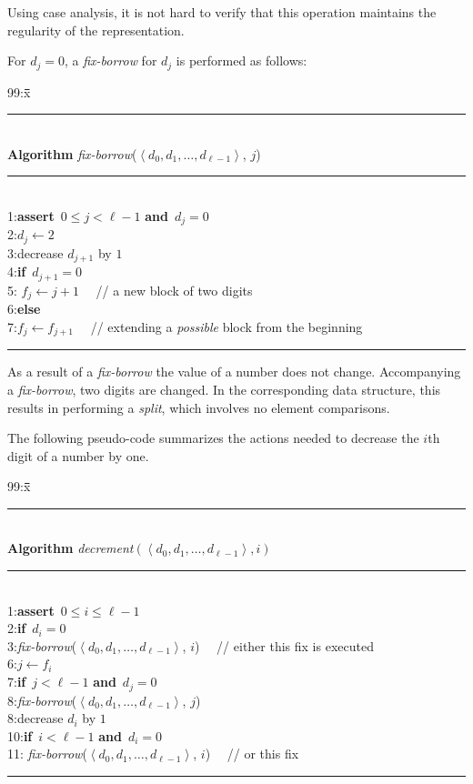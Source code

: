 \documentclass{llncs}
\newenvironment{algorithm}{\par\vspace*{-2mm}\quad\begin{minipage}[t]{0.925\textwidth}\begin{tabbing}99:x\=\quad\=\quad\=\quad\=\quad\=\quad\=\kill}{\end{tabbing}\end{minipage}\par\vspace*{-3mm}}
\newcommand{\ASSERT}{\textbf{assert}\ }
\newcommand{\IF}{\textbf{if}\ }
\newcommand{\ELSE}{\textbf{else}\ }
\newcommand{\AND}{\textbf{and}\ }
\newcommand{\sequence}[1]{\left\langle#1\right\rangle}
\begin{document}
\noindent
Using case analysis, it is not hard to verify that this operation maintains the
regularity of the representation.

For $d_j=0$, a \emph{fix-borrow} for $d_j$ is performed as follows: 

\begin{center}
\begin{algorithm}
\rule[6pt]{\textwidth}{0.45pt}\\[-6pt]
\textbf{Algorithm} \textit{fix-borrow}($\sequence{d_0,d_1,\ldots,d_{\ell-1}}$, $j$)\\
\rule[6pt]{\textwidth}{0.45pt}\\[-6pt]
1:\>\ASSERT $0 \leq j < \ell-1$ \AND $d_j=0$\\
2:\>$d_j \leftarrow 2$\\
3:\>decrease $d_{j+1}$ by $1$\\
4:\>\IF $d_{j+1} = 0$\\ 
5:\>\> $f_j \leftarrow j+1$ ~~// a new block of two digits\\
6:\>\ELSE\\
7:\>\>$f_j \leftarrow f_{j+1}$ ~~// extending a \emph{possible} block from the beginning\\ 
\rule[6pt]{\textwidth}{0.45pt}
\end{algorithm}
\end{center}

\noindent
As a result of a {\it fix-borrow} the value of a number does not change.
Accompanying a {\it fix-borrow}, two digits are changed. In the
corresponding data structure, this results in performing a
\emph{split}, which involves no element comparisons.

The following pseudo-code summarizes the actions needed to decrease
the $i$th digit of a number by one.

\begin{center}
\begin{algorithm}
\rule[6pt]{\textwidth}{0.45pt}\\[-6pt]
\textbf{Algorithm} \textit{decrement}$(\sequence{d_0,d_1,\ldots,d_{\ell-1}}, i)$\\
\rule[6pt]{\textwidth}{0.45pt}\\[-6pt]
1:\>\ASSERT $0 \leq i \leq \ell-1$\\
2:\>\IF $d_i = 0$\\
3:\>\>\textit{fix-borrow}($\sequence{d_0,d_1,\ldots,d_{\ell-1}}$, $i$)
~~// either this fix is executed\\
6:\>$j \leftarrow f_i$\\
7:\>\IF $j < \ell-1$ \AND $d_j = 0$\\
8:\>\>\textit{fix-borrow}($\sequence{d_0,d_1,\ldots,d_{\ell-1}}$, $j$)\\
8:\>decrease $d_i$ by $1$\\
10:\>\IF $i < \ell-1$ \AND $d_i = 0$\\
11:\>\> \textit{fix-borrow}($\sequence{d_0,d_1,\ldots,d_{\ell-1}}$,
$i$) ~~// or this fix\\
\rule[6pt]{\textwidth}{0.45pt}
\end{algorithm}
\end{center}
\end{document}
